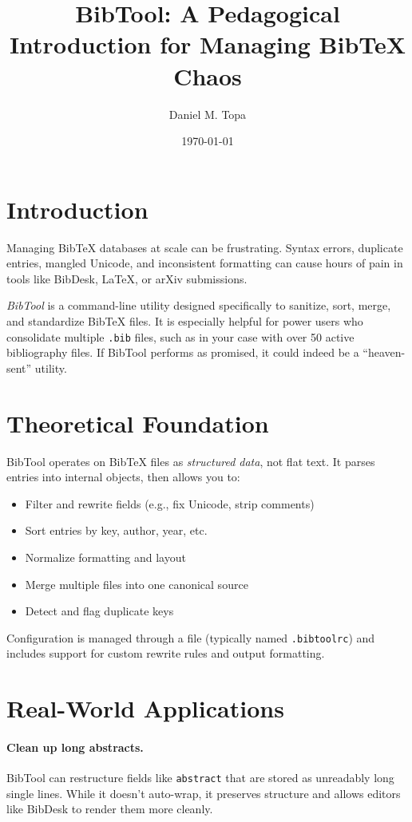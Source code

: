 \documentclass[12pt]{article}
\title{BibTool: A Pedagogical Introduction for Managing Bib\TeX{} Chaos}
\author{Daniel M. Topa}
\date{\today}
\begin{document}
\maketitle

\section{Introduction}

Managing Bib\TeX{} databases at scale can be frustrating. Syntax errors, duplicate entries, mangled Unicode, and inconsistent formatting can cause hours of pain in tools like BibDesk, \LaTeX, or arXiv submissions.

\emph{BibTool} is a command-line utility designed specifically to sanitize, sort, merge, and standardize Bib\TeX{} files. It is especially helpful for power users who consolidate multiple \texttt{.bib} files, such as in your case with over 50 active bibliography files. If BibTool performs as promised, it could indeed be a ``heaven-sent'' utility.

\section{Theoretical Foundation}

BibTool operates on Bib\TeX{} files as \emph{structured data}, not flat text. It parses entries into internal objects, then allows you to:
\begin{itemize}
  \item Filter and rewrite fields (e.g., fix Unicode, strip comments)
  \item Sort entries by key, author, year, etc.
  \item Normalize formatting and layout
  \item Merge multiple files into one canonical source
  \item Detect and flag duplicate keys
\end{itemize}

Configuration is managed through a file (typically named \texttt{.bibtoolrc}) and includes support for custom rewrite rules and output formatting.

\section{Real-World Applications}

\paragraph{Clean up long abstracts.} BibTool can restructure fields like \texttt{abstract} that are stored as unreadably long single lines. While it doesn't auto-wrap, it preserves structure and allows editors like BibDesk to render them more cleanly.
\end{document}

